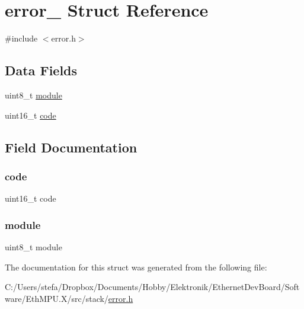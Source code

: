 \hypertarget{structerror__}{}\section{error\+\_\+ Struct Reference}
\label{structerror__}


{\ttfamily \#include $<$error.\+h$>$}

\subsection*{Data Fields}
\begin{DoxyCompactItemize}
\item 
uint8\+\_\+t \mbox{\hyperlink{structerror___a8dc5dbc13ebe8eb221673980e57465b6}{module}}
\item 
uint16\+\_\+t \mbox{\hyperlink{structerror___a70008c0b7822b172472813e6730ea565}{code}}
\end{DoxyCompactItemize}


\subsection{Field Documentation}
\mbox{\label{structerror___a70008c0b7822b172472813e6730ea565}} 
\subsubsection{\texorpdfstring{code}{code}}
{\footnotesize\ttfamily uint16\+\_\+t code}

\mbox{\label{structerror___a8dc5dbc13ebe8eb221673980e57465b6}} 
\subsubsection{\texorpdfstring{module}{module}}
{\footnotesize\ttfamily uint8\+\_\+t module}



The documentation for this struct was generated from the following file\+:\begin{DoxyCompactItemize}
\item 
C\+:/\+Users/stefa/\+Dropbox/\+Documents/\+Hobby/\+Elektronik/\+Ethernet\+Dev\+Board/\+Software/\+Eth\+M\+P\+U.\+X/src/stack/\mbox{\hyperlink{error_8h}{error.\+h}}\end{DoxyCompactItemize}
